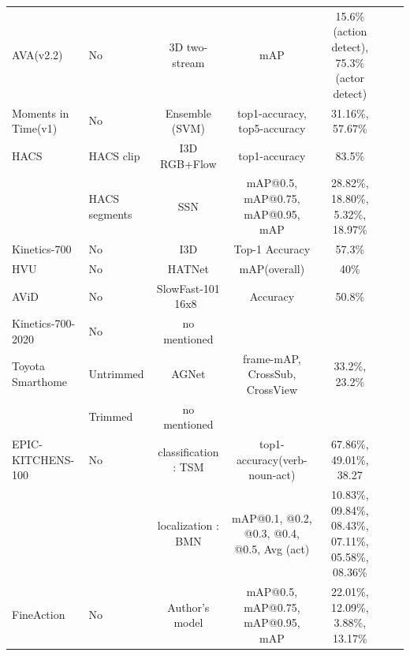 \documentclass[a4paper]{article}
\begin{document}
\begin{table}
\begin{tabular}{l|l|c c c c c}
		AVA(v2.2)               & No            & 3D two-stream              & mAP                                        & 15.6\%(action detect), 75.3\%(actor detect)          \\
		Moments in Time(v1)     & No            & Ensemble (SVM)             & top1-accuracy, top5-accuracy               & 31.16\%, 57.67\%                                     \\
		HACS                    & HACS clip     & I3D RGB+Flow               & top1-accuracy                              & 83.5\%                                               \\
		                        & HACS segments & SSN                        & mAP@0.5, mAP@0.75, mAP@0.95, mAP           & 28.82\%, 18.80\%, 5.32\%, 18.97\%                    \\
		Kinetics-700            & No            & I3D                        & Top-1 Accuracy                             & 57.3\%                                               \\
		HVU                     & No            & HATNet                     & mAP(overall)                               & 40\%                                                 \\
		AViD                    & No            & SlowFast-101 16x8          & Accuracy                                   & 50.8\%                                               \\
		Kinetics-700-2020       & No            & no mentioned               &                                            &                                                      \\
		Toyota Smarthome        & Untrimmed     & AGNet                      & frame-mAP, CrossSub, CrossView             & 33.2\%, 23.2\%                                       \\
	                          	& Trimmed       & no mentioned               &                                            &                                                      \\
		EPIC-KITCHENS-100       & No            & classification : TSM       & top1-accuracy(verb-noun-act)               & 67.86\%, 49.01\%, 38.27                              \\	
		                        &               & localization : BMN         & mAP@0.1, @0.2, @0.3, @0.4, @0.5, Avg (act) & 10.83\%, 09.84\%, 08.43\%, 07.11\%, 05.58\%, 08.36\% \\
		FineAction              & No            & Author's model             & mAP@0.5, mAP@0.75, mAP@0.95, mAP           & 22.01\%, 12.09\%, 3.88\%, 13.17\%                    \\
		\bottomrule
		
	\end{tabular}%
	\label{BenchmarkMetric}
\end{table}%
\end{document}
